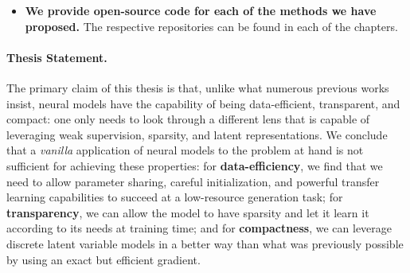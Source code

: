 \begin{itemize}
      \item \textbf{We provide open-source code for each of the
                  methods we have proposed.}
            The respective repositories can be found in each
            of the chapters.


\end{itemize}

\paragraph*{Thesis Statement.} The primary claim of this thesis is
that, unlike what numerous previous works insist, neural
models have the capability of being data-efficient, transparent, and
compact: one only needs to look through a different lens that is
capable of leveraging weak supervision, sparsity, and latent
representations. We conclude that a \textit{vanilla}
application of neural models to the problem at hand is not sufficient
for achieving these properties: for \textbf{data-efficiency}, we find that we need
to allow parameter sharing, careful initialization, and powerful
transfer learning capabilities to succeed at a low-resource
generation task; for \textbf{transparency}, we can allow the model to have
sparsity and let it learn it according to its needs at training time; and
for \textbf{compactness}, we can leverage discrete latent variable models in a
better way than what was previously possible by using an exact but
efficient gradient.
